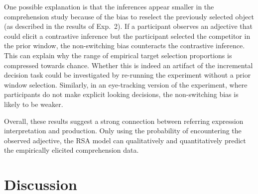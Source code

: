 \documentclass[10pt,letterpaper]{article}
\begin{document}
One possible explanation is that the inferences appear smaller in the comprehension study because of the bias to reselect the previously selected object (as described in the results of Exp.~2). If a participant observes an adjective that could elicit a contrastive inference but the participant selected the competitor in the prior window, the non-switching bias counteracts the contrastive inference. This can explain why the range of empirical target selection proportions is compressed towards chance. Whether this is indeed an artifact of the incremental decision task could be investigated by re-running the experiment without a prior window selection. Similarly, in an eye-tracking version of the experiment, where participants do not make explicit looking decisions, the non-switching bias is likely to be weaker.

Overall, these results suggest a strong connection between referring expression interpretation and production. Only using the probability of encountering the observed adjective, the RSA model can qualitatively and quantitatively predict the empirically elicited comprehension data. 


\section{Discussion}
\end{document}
